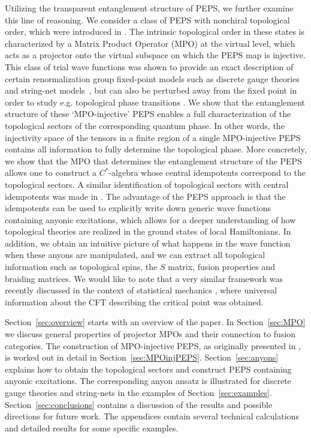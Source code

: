 \documentclass[12 pt]{article}
\begin{document}
Utilizing the transparent entanglement structure of PEPS, we further examine this line of reasoning. We consider a class of PEPS with nonchiral topological order, which were introduced in \cite{Criticality,Ginjectivity,Buerschaper14,MPOpaper}. The intrinsic topological order in these states is characterized by a Matrix Product Operator (MPO) at the virtual level, which acts as a projector onto the virtual subspace on which the PEPS map is injective. This class of trial wave functions was shown to provide an exact description of certain renormalization group fixed-point models such as discrete gauge theories \cite{SPTpaper} and string-net models~\cite{stringnet1,stringnet2,MPOpaper}, but can also be perturbed away from the fixed point in order to study e.g. topological phase transitions \cite{transfermatrix,shadows}. We show that the entanglement structure of these `MPO-injective' PEPS enables a full characterization of the topological sectors of the corresponding quantum phase. In other words, the injectivity space of the tensors in a finite region of a single MPO-injective PEPS contains all information to fully determine the topological phase. More concretely, we show that the MPO that determines the entanglement structure of the PEPS allows one to construct a $C^*$-algebra whose central idempotents correspond to the topological sectors. A similar identification of topological sectors with central idempotents was made in \cite{Qalgebra,haah}. The advantage of the PEPS approach is that the idempotents can be used to explicitly write down generic wave functions containing anyonic excitations, which allows for a deeper understanding of how topological theories are realized in the ground states of local Hamiltonians. In addition, we obtain an intuitive picture of what happens in the wave function when these anyons are manipulated, and we can extract all topological information such as topological spins, the $S$ matrix, fusion properties and  braiding matrices. We would like to note that a very similar framework was recently discussed in the context of statistical mechanics \cite{Aasen}, where universal information about the CFT describing the critical point was obtained.

Section~\ref{sec:overview} starts with an overview of the paper. In Section~\ref{sec:MPO} we discuss general properties of projector MPOs and their connection to fusion categories. The construction of MPO-injective PEPS, as originally presented in \cite{MPOpaper}, is worked out in detail in Section~\ref{sec:MPOinjPEPS}. Section~\ref{sec:anyons} explains how to obtain the topological sectors and construct PEPS containing anyonic excitations. The corresponding anyon ansatz is illustrated for discrete gauge theories and string-nets in the examples of Section~\ref{sec:examples}. Section~\ref{sec:conclusions} contains a discussion of the results and possible directions for future work. The appendices contain several technical calculations and detailed results for some specific examples.
\end{document}
